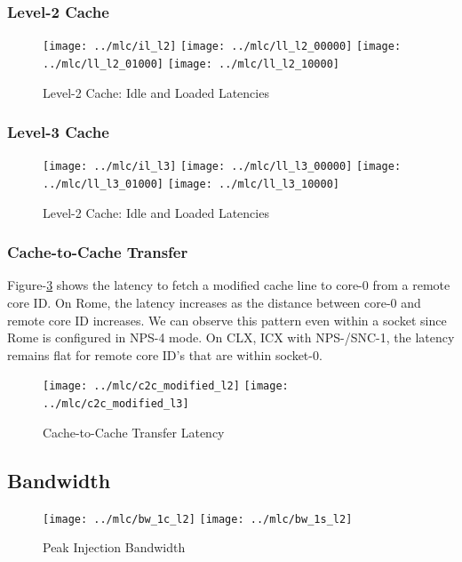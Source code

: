 \documentclass{article}
\begin{document}
\subsubsection{Level-2 Cache}
\begin{figure}[!ht]
    \centering
    \texttt{[image: ../mlc/il\_l2]}
    \texttt{[image: ../mlc/ll\_l2\_00000]}
    \texttt{[image: ../mlc/ll\_l2\_01000]}
    \texttt{[image: ../mlc/ll\_l2\_10000]}
    \caption{Level-2 Cache: Idle and Loaded Latencies}
    \label{figure:mlc_lat_l2}
\end{figure}
\subsubsection{Level-3 Cache}
\begin{figure}[!ht]
    \centering
    \texttt{[image: ../mlc/il\_l3]}
    \texttt{[image: ../mlc/ll\_l3\_00000]}
    \texttt{[image: ../mlc/ll\_l3\_01000]}
    \texttt{[image: ../mlc/ll\_l3\_10000]}
    \caption{Level-2 Cache: Idle and Loaded Latencies}
    \label{figure:mlc_lat_l3}
\end{figure}
\subsubsection{Cache-to-Cache Transfer}
Figure-\ref{figure:mlc_c2c_modified} shows the latency to fetch a modified cache line to core-0 from a remote core ID. On Rome, the latency increases as the distance between core-0 and remote core ID increases. We can observe this pattern even within a socket since Rome is configured in NPS-4 mode. On CLX, ICX with NPS-/SNC-1, the latency remains flat for remote core ID's that are within socket-0.
\begin{figure}[!hb]
    \centering
    \texttt{[image: ../mlc/c2c\_modified\_l2]}
    \texttt{[image: ../mlc/c2c\_modified\_l3]}
    \caption{Cache-to-Cache Transfer Latency}
    \label{figure:mlc_c2c_modified}
\end{figure}

\subsection{Bandwidth}

\begin{figure}[!hb]
    \centering
    \texttt{[image: ../mlc/bw\_1c\_l2]}
    \texttt{[image: ../mlc/bw\_1s\_l2]}
    \caption{Peak Injection Bandwidth}
    \label{figure:mlc_bw}
\end{figure}
\end{document}
